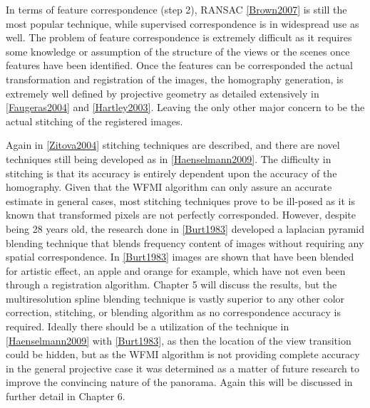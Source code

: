   In terms of feature correspondence (step 2), RANSAC \ref{Brown2007} is still the most popular technique, while supervised correspondence is in widespread use as well. The problem of feature correspondence is extremely difficult as it requires some knowledge or assumption of the structure of the views or the scenes once features have been identified. Once the features can be corresponded the actual transformation and registration of the images, the homography generation, is extremely well defined by projective geometry as detailed extensively in \ref{Faugeras2004} and \ref{Hartley2003}. Leaving the only other major concern to be the actual stitching of the registered images.
  
   Again in \ref{Zitova2004} stitching techniques are described, and there are novel techniques still being developed as in \ref{Haenselmann2009}. The difficulty in stitching is that its accuracy is entirely dependent upon the accuracy of the homography. Given that the WFMI algorithm can only assure an accurate estimate in general cases, most stitching techniques prove to be ill-posed as it is known that transformed pixels are not perfectly corresponded. However, despite being 28 years old, the research done in \ref{Burt1983} developed a laplacian pyramid blending technique that blends frequency content of images without requiring any spatial correspondence. In \ref{Burt1983} images are shown that have been blended for artistic effect, an apple and orange for example, which have not even been through a registration algorithm. Chapter 5 will discuss the results, but the multiresolution spline blending technique is vastly superior to any other color correction, stitching, or blending algorithm as no correspondence accuracy is required. Ideally there should be a utilization of the technique in \ref{Haenselmann2009} with \ref{Burt1983}, as then the location of the view transition could be hidden, but as the WFMI algorithm is not providing complete accuracy in the general projective case it was determined as a matter of future research to improve the convincing nature of the panorama. Again this will be discussed in further detail in Chapter 6.
 
 




